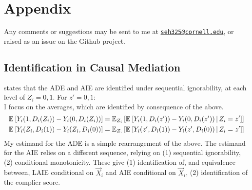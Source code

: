 \onehalfspacing
\appendix
\setcounter{table}{0}
\renewcommand{\thetable}{A\arabic{table}}
\setcounter{figure}{0}
\renewcommand{\thefigure}{A\arabic{figure}}

\section{Appendix}
\label{appendix}
Any comments or suggestions may be sent to me at \href{mailto:seh325@cornell.edu}{\nolinkurl{seh325@cornell.edu}}, or raised as an issue on the Github project.

\subsection{Identification in Causal Mediation}
\label{appendix:identification}
\citet[Theorem~1]{imai2010identification} states that the ADE and AIE are identified under sequential ignorability, at each level of $Z_i = 0,1$.
For $z' = 0,1$: \\
I focus on the averages, which are identified by consequence of the above.
\begin{align*}
    \E{ Y_i(1, D_i(Z_i)) - Y_i(0, D_i(Z_i))}
    &= \E[Z_i]{\Egiven{ Y_i(1, D_i(z')) - Y_i(0, D_i(z'))}{Z_i = z'}} \\
    \E{ Y_i(Z_i, D_i(1)) - Y_i(Z_i, D_i(0))}
    & = \E[Z_i]{\Egiven{ Y_i(z', D_i(1)) - Y_i(z', D_i(0))}{Z_i = z'}}
\end{align*}
My estimand for the ADE is a simple rearrangement of the above.
The estimand for the AIE relies on a different sequence, relying on (1) sequential ignorability, (2) conditional monotonicity.
These give (1) identification of, and equivalence between, LAIE conditional on $\vec X_i$ and AIE conditional on $\vec X_i$, (2) identification of the complier score.

